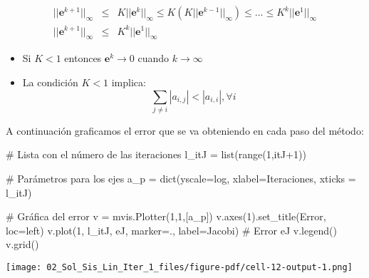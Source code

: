 \documentclass[
  letterpaper,
  DIV=11,
  numbers=noendperiod]{scrreprt}
\newenvironment{Shaded}{\begin{snugshade}}{\end{snugshade}}
\newcommand{\BuiltInTok}[1]{\textcolor[rgb]{0.00,0.23,0.31}{#1}}
\newcommand{\CommentTok}[1]{\textcolor[rgb]{0.37,0.37,0.37}{#1}}
\newcommand{\DecValTok}[1]{\textcolor[rgb]{0.68,0.00,0.00}{#1}}
\newcommand{\NormalTok}[1]{\textcolor[rgb]{0.00,0.23,0.31}{#1}}
\newcommand{\OperatorTok}[1]{\textcolor[rgb]{0.37,0.37,0.37}{#1}}
\newcommand{\StringTok}[1]{\textcolor[rgb]{0.13,0.47,0.30}{#1}}
\begin{document}
\[
\begin{eqnarray*}
|| \mathbf{e}^{k+1} ||_\infty & \le &  K || \mathbf{e}^{k} ||_\infty \le K \left( K || \mathbf{e}^{k-1} ||_\infty \right) \le
\dots \le K^k || \mathbf{e}^{1} ||_\infty \\
|| \mathbf{e}^{k+1} ||_\infty & \le &  K^k || \mathbf{e}^{1} ||_\infty
\end{eqnarray*}
\]

\begin{itemize}
\item
  Si \(K < 1\) entonces \(\mathbf{e}^{k} \rightarrow 0\) cuando
  \(k \rightarrow \infty\)
\item
  La condición \(K < 1\) implica: \[
  \sum_{j \neq i} |a_{i,j}| < |a_{i,i}|, \forall i
  \]
\end{itemize}

A continuación graficamos el error que se va obteniendo en cada paso del
método:

\begin{Shaded}
\begin{Highlighting}[]
\CommentTok{\# Lista con el número de las iteraciones}
\NormalTok{l\_itJ }\OperatorTok{=} \BuiltInTok{list}\NormalTok{(}\BuiltInTok{range}\NormalTok{(}\DecValTok{1}\NormalTok{,itJ}\OperatorTok{+}\DecValTok{1}\NormalTok{)) }

\CommentTok{\# Parámetros para los ejes}
\NormalTok{a\_p }\OperatorTok{=} \BuiltInTok{dict}\NormalTok{(yscale}\OperatorTok{=}\StringTok{\textquotesingle{}log\textquotesingle{}}\NormalTok{, xlabel}\OperatorTok{=}\StringTok{\textquotesingle{}Iteraciones\textquotesingle{}}\NormalTok{, xticks }\OperatorTok{=}\NormalTok{ l\_itJ)}

\CommentTok{\# Gráfica del error}
\NormalTok{v }\OperatorTok{=}\NormalTok{ mvis.Plotter(}\DecValTok{1}\NormalTok{,}\DecValTok{1}\NormalTok{,[a\_p]) }
\NormalTok{v.axes(}\DecValTok{1}\NormalTok{).set\_title(}\StringTok{\textquotesingle{}Error\textquotesingle{}}\NormalTok{, loc}\OperatorTok{=}\StringTok{\textquotesingle{}left\textquotesingle{}}\NormalTok{)}
\NormalTok{v.plot(}\DecValTok{1}\NormalTok{, l\_itJ, eJ, marker}\OperatorTok{=}\StringTok{\textquotesingle{}.\textquotesingle{}}\NormalTok{, label}\OperatorTok{=}\StringTok{\textquotesingle{}Jacobi\textquotesingle{}}\NormalTok{) }\CommentTok{\# Error eJ}
\NormalTok{v.legend()}
\NormalTok{v.grid()}
\end{Highlighting}
\end{Shaded}

\texttt{[image: 02\_Sol\_Sis\_Lin\_Iter\_1\_files/figure-pdf/cell-12-output-1.png]}
\end{document}
